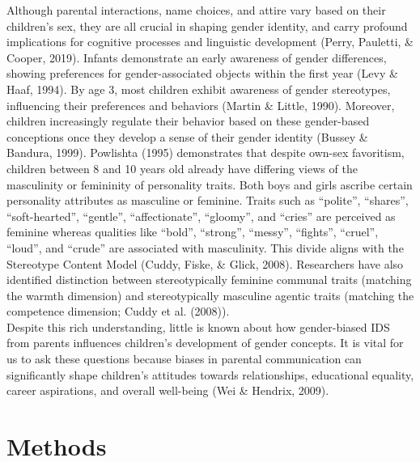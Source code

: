 \documentclass[
  man]{apa6}
\begin{document}
Although parental interactions, name choices, and attire vary based on their children's sex, they are all crucial in shaping gender identity, and carry profound implications for cognitive processes and linguistic development (Perry, Pauletti, \& Cooper, 2019). Infants demonstrate an early awareness of gender differences, showing preferences for gender-associated objects within the first year (Levy \& Haaf, 1994). By age 3, most children exhibit awareness of gender stereotypes, influencing their preferences and behaviors (Martin \& Little, 1990). Moreover, children increasingly regulate their behavior based on these gender-based conceptions once they develop a sense of their gender identity (Bussey \& Bandura, 1999). Powlishta (1995) demonstrates that despite own-sex favoritism, children between 8 and 10 years old already have differing views of the masculinity or femininity of personality traits. Both boys and girls ascribe certain personality attributes as masculine or feminine. Traits such as ``polite'', ``shares'', ``soft-hearted'', ``gentle'', ``affectionate'', ``gloomy'', and ``cries'' are perceived as feminine whereas qualities like ``bold'', ``strong'', ``messy'', ``fights'', ``cruel'', ``loud'', and ``crude'' are associated with masculinity. This divide aligns with the Stereotype Content Model (Cuddy, Fiske, \& Glick, 2008). Researchers have also identified distinction between stereotypically feminine communal traits (matching the warmth dimension) and stereotypically masculine agentic traits (matching the competence dimension; Cuddy et al. (2008)).\\
Despite this rich understanding, little is known about how gender-biased IDS from parents influences children's development of gender concepts.
It is vital for us to ask these questions because biases in parental communication can significantly shape children's attitudes towards relationships, educational equality, career aspirations, and overall well-being (Wei \& Hendrix, 2009).

\hypertarget{methods}{%
\section{Methods}\label{methods}}
\end{document}
